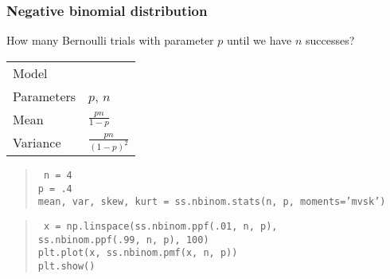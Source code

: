 \begin{frame}
  \frametitle{Negative binomial distribution}

  How many Bernoulli trials with parameter $p$ until we have $n$
  successes?

  \begin{tabular}{l|l}
    Model & \\[1mm]
    Parameters & $p$, $n$\\[1mm]
    Mean & $\frac{pn}{1-p}$\\[1mm]
    Variance & $\frac{pn}{(1-p)^2}$
  \end{tabular}

  \vspace{6mm}
   {
    \begin{quote}
      \tt
      n = 4\\
      p = .4\\
      mean, var, skew, kurt = ss.nbinom.stats(n, p, moments='mvsk')
    \end{quote}
    
  }
   {
    \begin{quote}
      \tt
      x = np.linspace(ss.nbinom.ppf(.01, n, p), \\
      \hspace{1cm} ss.nbinom.ppf(.99, n, p), 100) \\
      plt.plot(x, ss.nbinom.pmf(x, n, p)) \\
      plt.show()
    \end{quote}

    \cnote {  }
  }


\end{frame}

